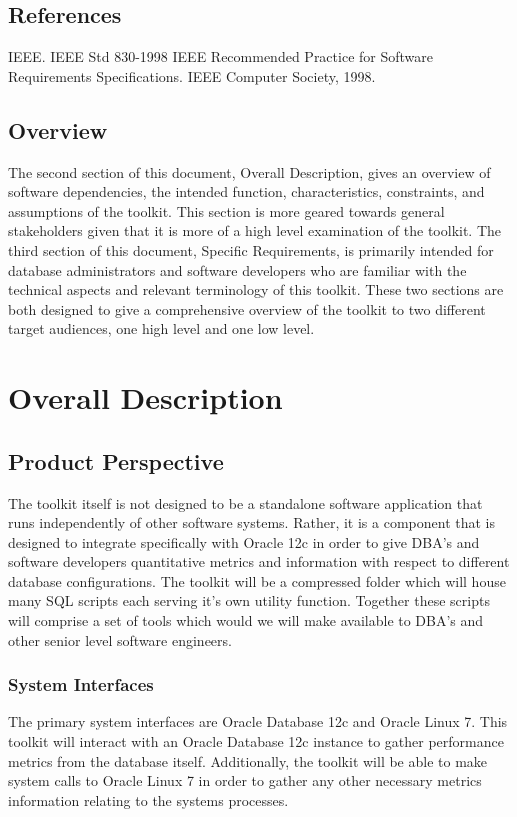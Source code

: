 \documentclass[draftclsnofoot, onecolumn, compsoc, 10pt]{IEEEtran}
\begin{document}
\subsection{References}
IEEE.   IEEE Std 830-1998 IEEE Recommended Practice for Software Requirements Specifications. IEEE Computer Society, 1998.

\subsection{Overview}
The second section of this document, Overall Description, gives an overview of software dependencies, the intended function, characteristics, constraints, and assumptions of the toolkit.
This section is more geared towards general stakeholders given that it is more of a high level examination of the toolkit.
The third section of this document, Specific Requirements, is primarily intended for database administrators and software developers who are familiar with the technical aspects and relevant terminology of this toolkit.
These two sections are both designed to give a comprehensive overview of the toolkit to two different target audiences, one high level and one low level.

\section{Overall Description}

\subsection{Product Perspective}
The toolkit itself is not designed to be a standalone software application that runs independently of other software systems.
Rather, it is a component that is designed to integrate specifically with Oracle 12c in order to give DBA's and software developers quantitative metrics and information with respect to different database configurations.
The toolkit will be a compressed folder which will house many SQL scripts each serving it's own utility function.
Together these scripts will comprise a set of tools which would we will make available to DBA's and other senior level software engineers.

\subsubsection{System Interfaces}
The primary system interfaces are Oracle Database 12c and Oracle Linux 7.
This toolkit will interact with an Oracle Database 12c instance to gather performance metrics from the database itself.
Additionally, the toolkit will be able to make system calls to Oracle Linux 7 in order to gather any other necessary metrics information relating to the systems processes.
\end{document}
